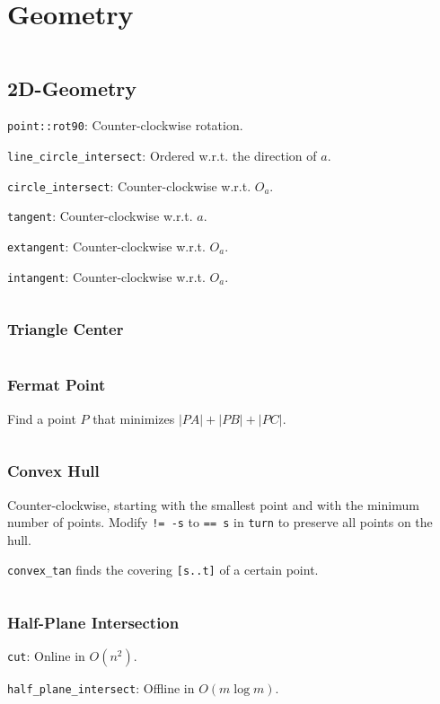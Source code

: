 \chapter{Geometry}
\inputminted{c++}{401-geometry.cpp}

\section{2D-Geometry}
\begin{compactenum}
    \item \texttt{point::rot90}: Counter-clockwise rotation.
    \item \texttt{line\_circle\_intersect}: Ordered w.r.t. the direction of $a$.
    \item \texttt{circle\_intersect}: Counter-clockwise w.r.t. $O_a$.
    \item \texttt{tangent}: Counter-clockwise w.r.t. $a$.
    \item \texttt{extangent}: Counter-clockwise w.r.t. $O_a$.
    \item \texttt{intangent}: Counter-clockwise w.r.t. $O_a$.
\end{compactenum}
\inputminted{c++}{410-2d-geometry.cpp}

\subsection{Triangle Center}
\inputminted{c++}{413-triangle-center.cpp}

\subsection{Fermat Point}
Find a point $P$ that minimizes $|PA|+|PB|+|PC|$.
\inputminted{c++}{414-fermat-point.cpp}

\subsection{Convex Hull}
Counter-clockwise, starting with the smallest point and with the minimum number of points. Modify \texttt{!= -s} to \texttt{== s} in \texttt{turn} to preserve all points on the hull.

\texttt{convex\_tan} finds the covering \texttt{[s..t]} of a certain point.
\inputminted{c++}{411-convex-hull.cpp}

\subsection{Half-Plane Intersection}
\begin{compactenum}
    \item \texttt{cut}: Online in $O(n^2)$.
    \item \texttt{half\_plane\_intersect}: Offline in $O(m\log m)$.
\end{compactenum}
\inputminted{c++}{412-half-plane-intersection.cpp}
